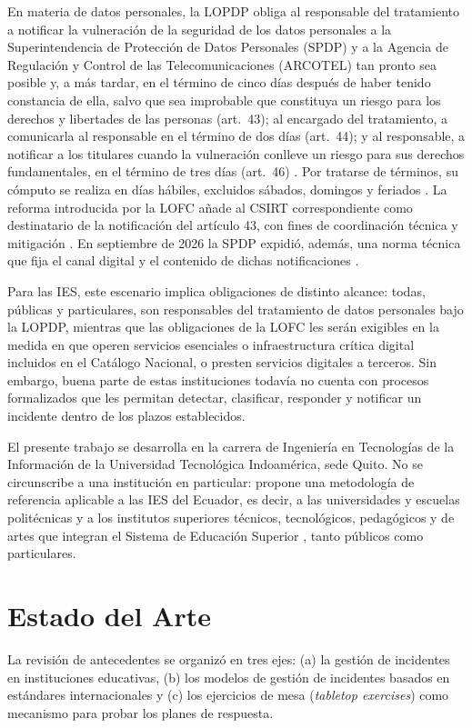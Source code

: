 En materia de datos personales, la LOPDP obliga al responsable del tratamiento a notificar la vulneración de la seguridad de los datos personales a la Superintendencia de Protección de Datos Personales (SPDP) y a la Agencia de Regulación y Control de las Telecomunicaciones (ARCOTEL) tan pronto sea posible y, a más tardar, en el término de cinco días después de haber tenido constancia de ella, salvo que sea improbable que constituya un riesgo para los derechos y libertades de las personas (art.~43); al encargado del tratamiento, a comunicarla al responsable en el término de dos días (art.~44); y al responsable, a notificar a los titulares cuando la vulneración conlleve un riesgo para sus derechos fundamentales, en el término de tres días (art.~46) \cite{lopdp2021}. Por tratarse de términos, su cómputo se realiza en días hábiles, excluidos sábados, domingos y feriados \cite{coa2017}. La reforma introducida por la LOFC añade al CSIRT correspondiente como destinatario de la notificación del artículo 43, con fines de coordinación técnica y mitigación \cite{lofc2026}. En septiembre de 2026 la SPDP expidió, además, una norma técnica que fija el canal digital y el contenido de dichas notificaciones \cite{spdp2026norma}.

Para las IES, este escenario implica obligaciones de distinto alcance: todas, públicas y particulares, son responsables del tratamiento de datos personales bajo la LOPDP, mientras que las obligaciones de la LOFC les serán exigibles en la medida en que operen servicios esenciales o infraestructura crítica digital incluidos en el Catálogo Nacional, o presten servicios digitales a terceros. Sin embargo, buena parte de estas instituciones todavía no cuenta con procesos formalizados que les permitan detectar, clasificar, responder y notificar un incidente dentro de los plazos establecidos.

El presente trabajo se desarrolla en la carrera de Ingeniería en Tecnologías de la Información de la Universidad Tecnológica Indoamérica, sede Quito. No se circunscribe a una institución en particular: propone una metodología de referencia aplicable a las IES del Ecuador, es decir, a las universidades y escuelas politécnicas y a los institutos superiores técnicos, tecnológicos, pedagógicos y de artes que integran el Sistema de Educación Superior \cite{loes2010}, tanto públicos como particulares.

\section{Estado del Arte}
La revisión de antecedentes se organizó en tres ejes: (a) la gestión de incidentes en instituciones educativas, (b) los modelos de gestión de incidentes basados en estándares internacionales y (c) los ejercicios de mesa (\textit{tabletop exercises}) como mecanismo para probar los planes de respuesta.

